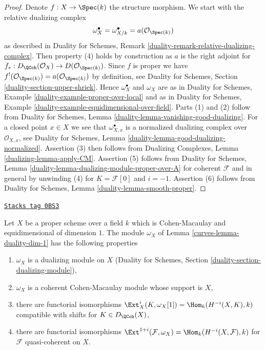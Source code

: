 \begin{proof}
Denote $f : X \to \Spec(k)$ the structure morphism.
We start with the relative dualizing complex
$$
\omega_X^\bullet = \omega_{X/k}^\bullet = a(\mathcal{O}_{\Spec(k)})
$$
as described in Duality for Schemes,
Remark \ref{duality-remark-relative-dualizing-complex}.
Then property (4) holds by construction as $a$ is the right
adjoint for $f_* : D_\QCoh(\mathcal{O}_X) \to D(\mathcal{O}_{\Spec(k)})$.
Since $f$ is proper we have
$f^!(\mathcal{O}_{\Spec(k)}) = a(\mathcal{O}_{\Spec(k)})$ by
definition, see
Duality for Schemes, Section \ref{duality-section-upper-shriek}.
Hence $\omega_X^\bullet$ and $\omega_X$ are as in
Duality for Schemes, Example \ref{duality-example-proper-over-local}
and as in
Duality for Schemes, Example \ref{duality-example-equidimensional-over-field}.
Parts (1) and (2) follow from
Duality for Schemes, Lemma \ref{duality-lemma-vanishing-good-dualizing}.
For a closed point $x \in X$ we see that $\omega_{X, x}^\bullet$ is a
normalized dualizing complex over $\mathcal{O}_{X, x}$, see
Duality for Schemes, Lemma \ref{duality-lemma-good-dualizing-normalized}.
Assertion (3) then follows from
Dualizing Complexes, Lemma \ref{dualizing-lemma-apply-CM}.
Assertion (5) follows from
Duality for Schemes, Lemma \ref{duality-lemma-dualizing-module-proper-over-A}
for coherent $\mathcal{F}$ and in general by unwinding
(4) for $K = \mathcal{F}[0]$ and $i = -1$.
Assertion (6) follows from Duality for Schemes,
Lemma \ref{duality-lemma-smooth-proper}.
\end{proof}

\begin{lemma}
\label{curves-lemma-duality-dim-1-CM}
\href{https://stacks.math.columbia.edu/tag/0BS3}{\texttt{Stacks tag 0BS3}}

Let $X$ be a proper scheme over a field $k$ which is Cohen-Macaulay
and equidimensional of dimension $1$. The module $\omega_X$
of Lemma \ref{curves-lemma-duality-dim-1} has the following properties
\begin{enumerate}
\item $\omega_X$ is a dualizing module on $X$
(Duality for Schemes, Section \ref{duality-section-dualizing-module}),
\item $\omega_X$ is a coherent Cohen-Macaulay module whose support is $X$,
\item there are functorial isomorphisms
$\Ext^i_X(K, \omega_X[1]) = \Hom_k(H^{-i}(X, K), k)$
compatible with shifts for $K \in D_\QCoh(X)$,
\item there are functorial isomorphisms
$\Ext^{1 + i}(\mathcal{F}, \omega_X) = \Hom_k(H^{-i}(X, \mathcal{F}), k)$
for $\mathcal{F}$ quasi-coherent on $X$.
\end{enumerate}
\end{lemma}

